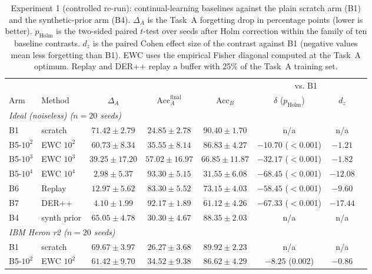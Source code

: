 \begin{table}[ht]
\centering
\small
\setlength{\tabcolsep}{3.5pt}
\caption{Experiment 1 (controlled re-run): continual-learning baselines against the plain scratch arm (B1) and the synthetic-prior arm (B4). $\Delta_A$ is the Task~A forgetting drop in percentage points (lower is better). $p_{\text{Holm}}$ is the two-sided paired $t$-test over seeds after Holm correction within the family of ten baseline contrasts. $d_z$ is the paired Cohen effect size of the contrast against B1 (negative values mean less forgetting than B1). EWC uses the empirical Fisher diagonal computed at the Task~A optimum. Replay and DER++ replay a buffer with 25\% of the Task~A training set.}
\label{tab:exp1_baselines}
\begin{tabular}{llccc@{\hskip 6pt}ccc}
\toprule
& & & & & \multicolumn{2}{c}{vs. B1} \\
\cmidrule(lr){6-7}
Arm & Method & $\Delta_A$ & $\text{Acc}_A^{\text{final}}$ & $\text{Acc}_B$ & $\delta$ ($p_{\text{Holm}}$) & $d_z$ \\
\midrule
\multicolumn{7}{l}{\textit{Ideal (noiseless) ($n=20$ seeds)}} \\
B1 & scratch & $71.42 \pm 2.79$ & $24.85 \pm 2.78$ & $90.40 \pm 1.70$ & n/a & n/a \\
B5-$10^2$ & EWC $10^2$ & $60.73 \pm 8.34$ & $35.55 \pm 8.14$ & $86.83 \pm 4.27$ & $-10.70$ ($<$0.001) & $-1.21$ \\
B5-$10^3$ & EWC $10^3$ & $39.25 \pm 17.20$ & $57.02 \pm 16.97$ & $66.85 \pm 11.87$ & $-32.17$ ($<$0.001) & $-1.82$ \\
B5-$10^4$ & EWC $10^4$ & $2.98 \pm 5.37$ & $93.30 \pm 5.15$ & $31.55 \pm 6.08$ & $-68.45$ ($<$0.001) & $-12.08$ \\
B6 & Replay & $12.97 \pm 5.62$ & $83.30 \pm 5.52$ & $73.15 \pm 4.03$ & $-58.45$ ($<$0.001) & $-9.60$ \\
B7 & DER++ & $4.10 \pm 1.99$ & $92.17 \pm 1.89$ & $61.12 \pm 4.26$ & $-67.33$ ($<$0.001) & $-17.44$ \\
B4 & synth prior & $65.05 \pm 4.78$ & $30.30 \pm 4.67$ & $88.35 \pm 2.03$ & n/a & n/a \\
\midrule
\multicolumn{7}{l}{\textit{IBM Heron r2 ($n=20$ seeds)}} \\
B1 & scratch & $69.67 \pm 3.97$ & $26.27 \pm 3.68$ & $89.92 \pm 2.23$ & n/a & n/a \\
B5-$10^2$ & EWC $10^2$ & $61.42 \pm 9.70$ & $34.52 \pm 9.38$ & $86.62 \pm 4.29$ & $-8.25$ (0.002) & $-0.86$ \\

\end{tabular}
\end{table}

